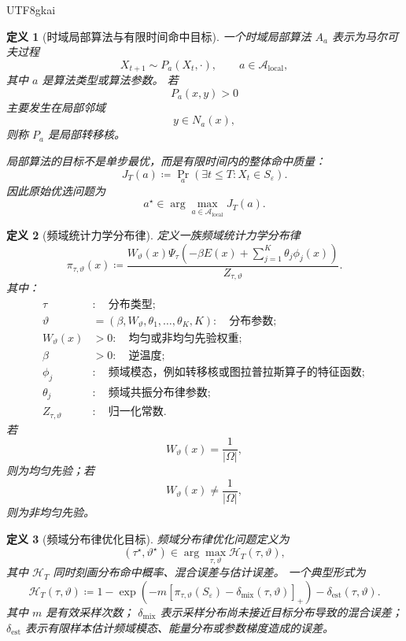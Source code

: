 \documentclass[12pt]{article}
\newtheorem{definition}{定义}[section]
\newcommand{\DefEq}{\coloneqq}
\begin{document}
\begin{CJK*}{UTF8}{gkai}
\begin{definition}[时域局部算法与有限时间命中目标]
\label{def:tex55-local-algorithm-objective}
一个时域局部算法 \(A_a\) 表示为马尔可夫过程
\[
  X_{t+1}\sim P_a(X_t,\cdot),
  \qquad
  a\in\mathcal A_{\mathrm{local}},
\]
其中 \(a\) 是算法类型或算法参数。
若
\[
  P_a(x,y)>0
\]
主要发生在局部邻域
\[
  y\in N_a(x),
\]
则称 \(P_a\) 是局部转移核。

局部算法的目标不是单步最优，而是有限时间内的整体命中质量：
\[
  J_T(a)
  \DefEq
  \Pr_a(\exists t\le T:X_t\in S_\varepsilon).
\]
因此原始优选问题为
\[
  a^\star
  \in
  \arg\max_{a\in\mathcal A_{\mathrm{local}}}J_T(a).
\]
\end{definition}

\begin{definition}[频域统计力学分布律]
\label{def:tex55-statistical-law}
定义一族频域统计力学分布律
\[
  \pi_{\tau,\vartheta}(x)
  \DefEq
  \frac{
  W_\vartheta(x)
  \Psi_{\tau}\!\left(
  -\beta E(x)+\sum_{j=1}^{K}\theta_j\phi_j(x)
  \right)
  }{
  Z_{\tau,\vartheta}
  }.
\]
其中：
\[
\begin{aligned}
  \tau&:\quad \text{分布类型};\\
  \vartheta&=(\beta,W_\vartheta,\theta_1,\ldots,\theta_K,K):\quad \text{分布参数};\\
  W_\vartheta(x)&>0:\quad \text{均匀或非均匀先验权重};\\
  \beta&>0:\quad \text{逆温度};\\
  \phi_j&:\quad \text{频域模态，例如转移核或图拉普拉斯算子的特征函数};\\
  \theta_j&:\quad \text{频域共振分布律参数};\\
  Z_{\tau,\vartheta}&:\quad \text{归一化常数}.
\end{aligned}
\]
若
\[
  W_\vartheta(x)=\frac1{|\Omega|},
\]
则为均匀先验；若
\[
  W_\vartheta(x)\ne\frac1{|\Omega|},
\]
则为非均匀先验。
\end{definition}

\begin{definition}[频域分布律优化目标]
\label{def:tex55-law-objective}
频域分布律优化问题定义为
\[
  (\tau^\star,\vartheta^\star)
  \in
  \arg\max_{\tau,\vartheta}
  \mathcal H_T(\tau,\vartheta),
\]
其中 \(\mathcal H_T\) 同时刻画分布命中概率、混合误差与估计误差。
一个典型形式为
\[
  \mathcal H_T(\tau,\vartheta)
  \DefEq
  1-\exp\left(
    -m\left[
      \pi_{\tau,\vartheta}(S_\varepsilon)
      -\delta_{\mathrm{mix}}(\tau,\vartheta)
    \right]_+
  \right)
  -
  \delta_{\mathrm{est}}(\tau,\vartheta).
\]
其中 \(m\) 是有效采样次数；
\(\delta_{\mathrm{mix}}\) 表示采样分布尚未接近目标分布导致的混合误差；
\(\delta_{\mathrm{est}}\) 表示有限样本估计频域模态、能量分布或参数梯度造成的误差。
\end{definition}


\end{CJK*}
\end{document}
